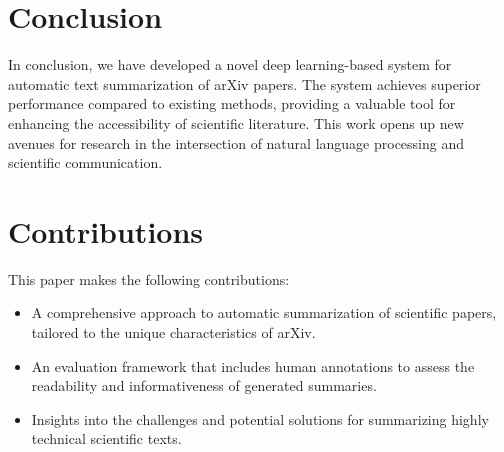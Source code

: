 \documentclass{article}
\begin{document}
\section{Conclusion}
\label{sec:conclusion}
In conclusion, we have developed a novel deep learning-based system for automatic text summarization of arXiv papers. The system achieves superior performance compared to existing methods, providing a valuable tool for enhancing the accessibility of scientific literature. This work opens up new avenues for research in the intersection of natural language processing and scientific communication.

\section{Contributions}
\label{sec:contributions}
This paper makes the following contributions:
\begin{itemize}
    \item A comprehensive approach to automatic summarization of scientific papers, tailored to the unique characteristics of arXiv.
    \item An evaluation framework that includes human annotations to assess the readability and informativeness of generated summaries.
    \item Insights into the challenges and potential solutions for summarizing highly technical scientific texts.
\end{itemize}



\end{document}
